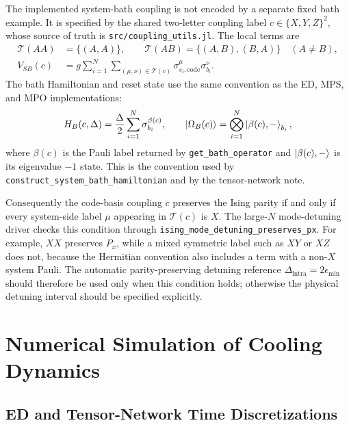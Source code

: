 \documentclass[aps,prx,twocolumn,superscriptaddress,nofootinbib,nolongbibliography,nobalancelastpage,10pt,floatfix]{revtex4-2}
\begin{document}
The implemented system-bath coupling is not encoded by a separate fixed bath
example.  It is specified by the shared two-letter coupling label
\(c\in\{X,Y,Z\}^2\), whose source of truth is
\texttt{src/coupling\_utils.jl}.  The local terms are
\begin{align}
    \mathcal T(AA)&=\{(A,A)\},\qquad
    \mathcal T(AB)=\{(A,B),(B,A)\}\quad(A\ne B),\\
    V_{SB}(c)&=
    g\sum_{i=1}^N\sum_{(\mu,\nu)\in\mathcal T(c)}
    \sigma^{\mu}_{s_i,\mathrm{code}}\sigma^{\nu}_{b_i}.
\end{align}
The bath Hamiltonian and reset state use the same convention as the ED, MPS,
and MPO implementations:
\begin{align}
    H_B(c,\Delta)=\frac{\Delta}{2}\sum_{i=1}^N
    \sigma^{\beta(c)}_{b_i},\qquad
    \ket{\Omega_B(c)}=\bigotimes_{i=1}^N
    \ket{\beta(c),-}_{b_i},
\end{align}
where \(\beta(c)\) is the Pauli label returned by
\texttt{get\_bath\_operator} and \(\ket{\beta(c),-}\) is its eigenvalue
\(-1\) state.  This is the convention used by
\texttt{construct\_system\_bath\_hamiltonian} and by the tensor-network note.

Consequently the code-basis coupling \(c\) preserves the Ising parity if and
only if every system-side label \(\mu\) appearing in \(\mathcal T(c)\) is
\(X\).  The large-\(N\) mode-detuning driver checks this condition through
\texttt{ising\_mode\_detuning\_preserves\_px}.  For example, \(XX\)
preserves \(P_x\), while a mixed symmetric label such as \(XY\) or \(XZ\) does
not, because the Hermitian convention also includes a term with a non-\(X\)
system Pauli.  The automatic parity-preserving detuning reference
\(\Delta_{\mathrm{intra}}=2\epsilon_{\min}\) should therefore be used only
when this condition holds; otherwise the physical detuning interval should be
specified explicitly.


\section{Numerical Simulation of Cooling Dynamics}


\subsection{ED and Tensor-Network Time Discretizations}
\end{document}
